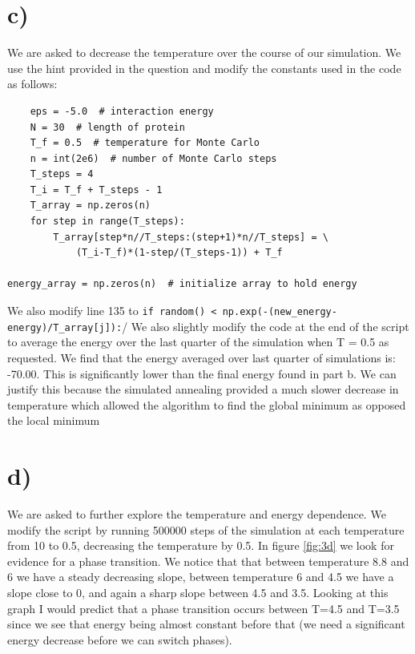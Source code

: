 \documentclass{article}
\begin{document}
\section*{c)}
We are asked to decrease the temperature over the course of our simulation. We use the hint provided in the question and modify the constants used in the code as follows:
\begin{verbatim}
    eps = -5.0  # interaction energy
    N = 30  # length of protein
    T_f = 0.5  # temperature for Monte Carlo
    n = int(2e6)  # number of Monte Carlo steps
    T_steps = 4
    T_i = T_f + T_steps - 1
    T_array = np.zeros(n)
    for step in range(T_steps):
        T_array[step*n//T_steps:(step+1)*n//T_steps] = \
            (T_i-T_f)*(1-step/(T_steps-1)) + T_f

energy_array = np.zeros(n)  # initialize array to hold energy

\end{verbatim}
We also modify line 135 to \texttt{if random() < np.exp(-(new_energy-energy)/T_array[j]):}/
We also slightly modify the code at the end of the script to average the energy over the last quarter of the simulation when T = 0.5 as requested. We find that the energy averaged over last quarter of simulations is: -70.00. This is significantly lower than the final energy found in part b. We can justify this because the simulated annealing provided a much slower decrease in temperature which allowed the algorithm to find the global minimum as opposed the local minimum 


\section*{d)}
We are asked to further explore the temperature and energy dependence. We modify the script by running 500000 steps of the simulation at each temperature from 10 to 0.5, decreasing the temperature by 0.5. 
In figure \ref{fig:3d} we look for evidence for a phase transition. We notice that that between temperature 8.8 and 6 we have a steady decreasing slope, between temperature 6 and 4.5 we have a slope close to 0, and again a sharp slope between 4.5 and 3.5. Looking at this graph I would predict that a phase transition occurs between T=4.5 and T=3.5 since we see that energy being almost constant before that (we need a significant energy decrease before we can switch phases).
\end{document}
